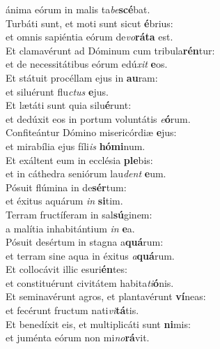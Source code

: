 \evenverse ánima eórum in malis ta\textit{be}\textbf{scé}bat.\\
\oddverse Turbáti sunt, et moti sunt sicut \textbf{é}brius:~\*\\
\oddverse et omnis sapiéntia eórum de\textit{vo}\textbf{rá}\textbf{ta} est.\\
\evenverse Et clamavérunt ad Dóminum cum tribula\textbf{rén}tur:~\*\\
\evenverse et de necessitátibus eórum edú\textit{xit} \textbf{e}os.\\
\oddverse Et státuit procéllam ejus in \textbf{au}ram:~\*\\
\oddverse et siluérunt flu\textit{ctus} \textbf{e}jus.\\
\evenverse Et lætáti sunt quia silu\textbf{é}runt:~\*\\
\evenverse et dedúxit eos in portum voluntátis \textit{e}\textbf{ó}rum.\\
\oddverse Confiteántur Dómino misericórdiæ \textbf{e}jus:~\*\\
\oddverse et mirabília ejus fíli\textit{is} \textbf{hó}\textbf{mi}num.\\
\evenverse Et exáltent eum in ecclésia \textbf{ple}bis:~\*\\
\evenverse et in cáthedra seniórum lau\textit{dent} \textbf{e}um.\\
\oddverse Pósuit flúmina in de\textbf{sér}tum:~\*\\
\oddverse et éxitus aquárum \textit{in} \textbf{si}tim.\\
\evenverse Terram fructíferam in sal\textbf{sú}ginem:~\*\\
\evenverse a malítia inhabitántium \textit{in} \textbf{e}a.\\
\oddverse Pósuit desértum in stagna a\textbf{quá}rum:~\*\\
\oddverse et terram sine aqua in éxitus \textit{a}\textbf{quá}rum.\\
\evenverse Et collocávit illic esuri\textbf{én}tes:~\*\\
\evenverse et constituérunt civitátem habita\textit{ti}\textbf{ó}nis.\\
\oddverse Et seminavérunt agros, et plantavérunt \textbf{ví}neas:~\*\\
\oddverse et fecérunt fructum nati\textit{vi}\textbf{tá}tis.\\
\evenverse Et benedíxit eis, et multiplicáti sunt \textbf{ni}mis:~\*\\
\evenverse et juménta eórum non mi\textit{no}\textbf{rá}vit.\\

